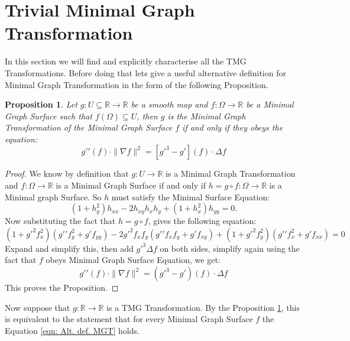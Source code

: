 \documentclass[12pt]{article}
\theoremstyle{plain}
\newtheorem{proposition}[theorem]{Proposition}
\theoremstyle{definition}
\theoremstyle{remark}
\begin{document}
	\section{Trivial Minimal Graph Transformation}
    In this section we will find and explicitly characterise all the TMG Transformations. Before doing that lets give a useful alternative definition for Minimal Graph Transformation in the form of the following Proposition.
    
    \begin{proposition}
    	\label{thm: Alt. def. MGT}
        Let \(g: U \subseteq \mathbb{R} \longrightarrow \mathbb{R}\) be a smooth map and \(f: \Omega \longrightarrow \mathbb{R} \) be a Minimal Graph Surface such that \(f(\Omega) \subseteq U\), then
        \(g\) is the Minimal Graph Transformation of the Minimal Graph Surface \(f\) if and only if they obeys the equation:
        \begin{equation}
        	\label{eqn: Alt. def. MGT}
        	g\prime\prime(f)\cdot \|\nabla f\|^2= [{g\prime}^3-g\prime](f) \cdot \Delta f
        \end{equation}
    \end{proposition}
    \begin{proof}
        We know by definition that \(g: U\longrightarrow\mathbb{R}\) is a Minimal Graph Transformation and \(f: \Omega \longrightarrow \mathbb{R} \) is a Minimal Graph Surface if and only if \(h = g \circ f : \Omega \longrightarrow \mathbb{R}\) is a Minimal graph Surface.  So \(h\) must satisfy the Minimal Surface Equation:
        \[
        (1 + h_y^2) h_{xx} - 2 h_{xy} h_x h_y + (1 + h_x^2) h_{yy} = 0.
        \]  
        Now substituting the fact that \(h=g\circ f\), gives the following equation:
        \[
        (1 + g\prime^2 f_x^2)(g\prime\prime f_y^2 + g\prime f_{yy}) - 2 g\prime^2 f_x f_y (g\prime\prime f_x f_y + g\prime f_{xy}) + (1 + g\prime^2 f_y^2)(g\prime\prime f_x^2 + g\prime f_{xx}) = 0
        \]
        Expand and simplify this, then add \(g\prime^3\Delta f\) on both sides, simplify again using the fact that \(f\) obeys Minimal Graph Surface Equation, we get:
        \[
        g\prime\prime(f)\cdot\|\nabla f\|^2= (g\prime^3-g\prime)(f)\cdot\Delta f
        \]
        This proves the Proposition.  
    \end{proof}

    
    Now suppose that \(g:\mathbb{R}\longrightarrow\mathbb{R}\) is a TMG Transformation. By the Proposition \ref{thm: Alt. def. MGT}, this is equivalent to the statement that for every Minimal Graph Surface \(f\) the Equation \ref{eqn: Alt. def. MGT} holds. 
    
\end{document}
